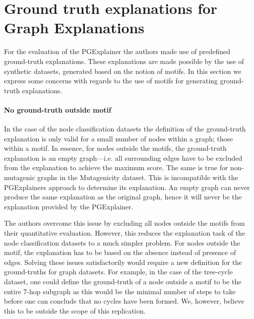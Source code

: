 \section{Ground truth explanations for Graph Explanations} \label{sec6}
For the evaluation of the PGExplainer the authors made use of predefined ground-truth explanations. These explanations are made possible by the use of synthetic datasets, generated based on the notion of motifs. In this section we express some concerns with regards to the use of motifs for generating ground-truth explanations. 

\paragraph{No ground-truth outside motif}
In the case of the node classification datasets the definition of the ground-truth explanation is only valid for a small number of nodes within a graph; those within a motif. In essence, for nodes outside the motifs, the ground-truth explanation is an empty graph---i.e. all surrounding edges have to be excluded from the explanation to achieve the maximum score. The same is true for non-mutagenic graphs in the Mutagenicity dataset. This is incompatible with the PGExplainers approach to determine its explanation. An empty graph can never produce the same explanation as the original graph, hence it will never be the explanation provided by the PGExplainer. 

The authors overcome this issue by excluding all nodes outside the motifs from their quantitative evaluation. However, this reduces the explanation task of the node classification datasets to a much simpler problem. For nodes outside the motif, the explanation has to be based on the absence instead of presence of edges. Solving these issues satisfactorily would require a new definition for the ground-truths for graph datasets. For example, in the case of the tree-cycle dataset, one could define the ground-truth of a node outside a motif to be the entire 7-hop subgraph as this would be the minimal number of steps to take before one can conclude that no cycles have been formed. We, however, believe this to be outside the scope of this replication.


